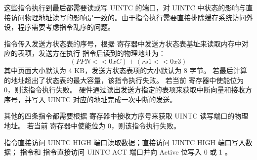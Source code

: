 这些指令执行到最后都需要读或写 UINTC 的端口，对 UINTC 中状态的影响与直接访问物理地址读写的影响是一致的。由于指令执行需要直接排除缓存系统访问外设，程序需要考虑指令乱序的问题。

\Iuipisend 指令传入发送方状态表的序号，根据 \Rsuist 寄存器中发送方状态表基址来读取内存中对应的表项，发送方在执行 \Iuipisend 指令后读到的物理地址为：
$$
( PPN << 0xC ) + ( rs1 << 0x3 )
$$
其中页面大小默认为 4 KB，发送方状态表项的大小默认为 8 字节。
若最后计算的地址超出了状态表的最大容量，该指令执行失败。
若当前 \Rsuist 寄存器中使能位为 0，则该指令执行失败。
硬件通过读出发送方指定的表项来获取中断向量和接收方序号，并写入 UINTC 对应的地址完成一次中断的发送。

其他的四条指令都需要根据 \Rsuirs 寄存器中接收方序号来获取 UINTC 读写端口的物理地址。
若当前 \Rsuirs 寄存器中使能位为 0，则该指令执行失败。

\Iuipiread 指令直接访问 UINTC HIGH 端口读取数据；\Iuipiwrite 直接访问 UINTC HIGH 端口写入数据；
\Iuipiact 指令和 \Iuipideact 指令直接访问 UINTC ACT 端口并向 Active 位写入 0 或 1 。


